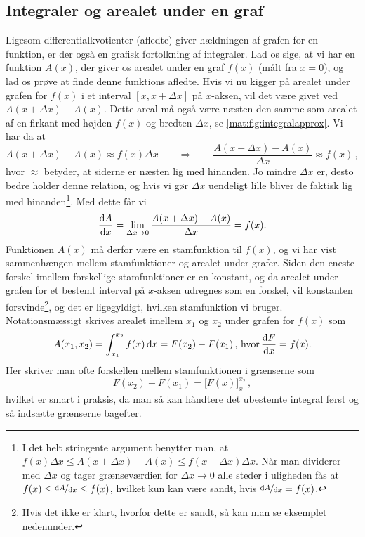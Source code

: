 \subsection{Integraler og arealet under en graf} \label{mat:subsec:int}
Ligesom differentialkvotienter (afledte) giver hældningen af grafen for en funktion, er der også en grafisk fortolkning af integraler.
Lad os sige, at vi har en funktion $A(x)$, der giver os arealet under en graf $f(x)$ (målt fra $x=0$), og lad os prøve at finde denne funktions afledte. Hvis vi nu kigger på arealet under grafen for $f(x)$ i et interval $[x,x+\Delta x]$ på $x$-aksen, vil det være givet ved $A(x+\Delta x) - A(x)$. Dette areal må også være næsten den samme som arealet af en firkant med højden $f(x)$ og bredten $\Delta x$, se \cref{mat:fig:integralapprox}. Vi har da at 
\begin{equation*}
    A(x+\Delta x) - A(x) \approx f(x)\Delta x \qquad \Rightarrow \qquad \frac{A(x+\Delta x) - A(x)}{\Delta x} \approx f(x) \, ,
\end{equation*}
hvor $\approx$ betyder, at siderne er næsten lig med hinanden. Jo mindre $\Delta x$ er, desto bedre holder denne relation, og hvis vi gør $\Delta x$ uendeligt lille bliver de faktisk lig med hinanden\footnote{I det helt stringente argument benytter man, at $f(x)\Delta x \leq A(x+\Delta x) - A(x) \leq f(x+\Delta x)\Delta x$. Når man dividerer med $\Delta x$ og tager grænseværdien for $\Delta x \rightarrow 0$ alle steder i uligheden fås at $f(x) \leq \nicefrac{\dd A}{\dd x} \leq f(x)$, hvilket kun kan være sandt, hvis $\nicefrac{\dd A}{\dd x} = f(x)$.}. Med dette får vi
\begin{equation*}
    \dv{A}{x}=\lim_{\Delta x\rightarrow 0}\frac{A(x+\Delta x) - A(x)}{\Delta x}=f(x).
\end{equation*}
Funktionen $A(x)$ må derfor være en stamfunktion til $f(x)$, og vi har vist sammenhængen mellem stamfunktioner og arealet under grafer. Siden den eneste forskel imellem forskellige stamfunktioner er en konstant, og da arealet under grafen for et bestemt interval på $x$-aksen udregnes som en forskel, vil konstanten forsvinde\footnote{Hvis det ikke er klart, hvorfor dette er sandt, så kan man se eksemplet nedenunder.}, og det er ligegyldigt, hvilken stamfunktion vi bruger.
Notationsmæssigt skrives arealet imellem $x_1$ og $x_2$ under grafen for $f(x)$ som
\begin{equation} \label{mat:eq:best_int}
A(x_1,x_2)=\int_{x_1}^{x_2}f(x)\dd{x}=F(x_2)-F(x_1) \, , \, \text{hvor} \, \dv{F}{x}=f(x).
\end{equation}
Her skriver man ofte forskellen mellem stamfunktionen i grænserne som
\begin{equation} \label{mat:eq:klammestamfunktion}
    F(x_2)-F(x_1)=\Big[F(x)\Big]_{x_1}^{x_2} \, ,
\end{equation}
hvilket er smart i praksis, da man så kan håndtere det ubestemte integral først og så indsætte grænserne bagefter.
